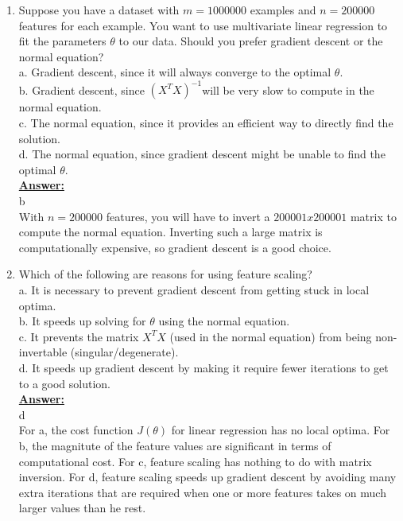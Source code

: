 \documentclass{article}
\newenvironment{qparts}{\begin{enumerate}[1.]}{\end{enumerate}}
\begin{document}
\begin{qparts}
\item Suppose you have a dataset with $m = 1000000$ examples and $n = 200000$ features for each example. You want to use multivariate linear regression to fit the parameters $\theta$ to our data. Should you prefer gradient descent or the normal equation?\\
a. Gradient descent, since it will always converge to the optimal $\theta$.\\
b. Gradient descent, since $(X^T X)^{-1} $will be very slow to compute in the normal equation.\\
c. The normal equation, since it provides an efficient way to directly find the solution.\\
d. The normal equation, since gradient descent might be unable to find the optimal $\theta$.\\
\underline{\textbf{Answer:}}\\
b\\
With $n = 200000$ features, you will have to invert a $200001 x 200001$ matrix to compute the normal equation. Inverting such a large matrix is computationally expensive, so gradient descent is a good choice.
 
 \item Which of the following are reasons for using feature scaling?\\
a. It is necessary to prevent gradient descent from getting stuck in local optima.\\
b. It speeds up solving for $\theta$ using the normal equation.\\
c. It prevents the matrix $X^T X$ (used in the normal equation) from being non-invertable (singular/degenerate).\\
d. It speeds up gradient descent by making it require fewer iterations to get to a good solution.\\
\underline{\textbf{Answer:}}\\
d\\
For a, the cost function $J(\theta)$ for linear regression has no local optima. For b, the magnitute of the feature values are significant in terms of computational cost. For c, feature scaling has nothing to do with matrix inversion. For d, feature scaling speeds up gradient descent by avoiding many extra iterations that are required when one or more features takes on much larger values than he rest.
 
\end{qparts}
\end{document}
